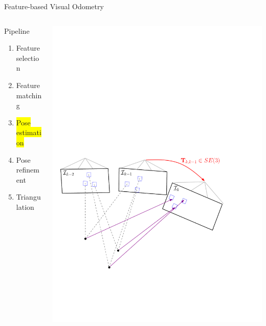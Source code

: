 \documentclass[10pt]{beamer}
\begin{document}
\begin{frame}{Feature-based Visual Odometry}
	\begin{columns}
	  \begin{column}{0.4\textwidth}
	  	\begin{block}{Pipeline}
		  	\begin{enumerate}
				\item Feature selection
				\item Feature matching
				\item \colorbox{yellow}{Pose estimation}
				\item Pose refinement
				\item Triangulation
			\end{enumerate}
		\end{block}
	  \end{column}
	  \begin{column}{0.6\textwidth}
	    \includegraphics[width=\textwidth]{img/vo_pipeline_5}

\end{column}
\end{columns}
\end{frame}
\end{document}
